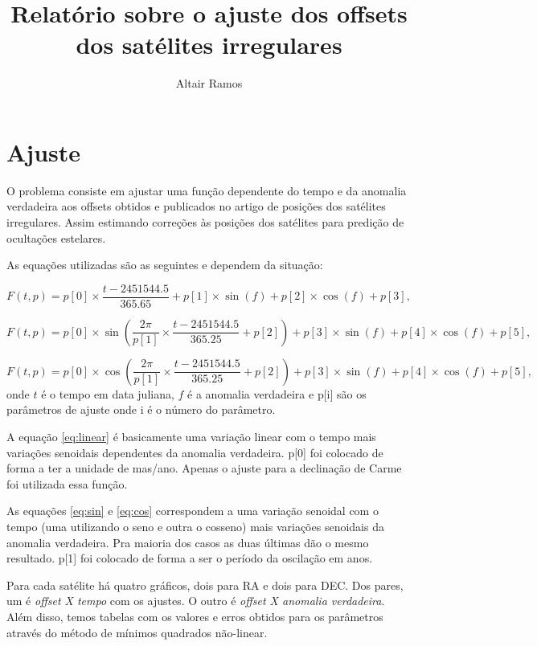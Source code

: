 \documentclass[11pt,a4paper]{report}
\title{Relatório sobre o ajuste dos offsets dos satélites irregulares}
\author{Altair Ramos}
\begin{document}
\maketitle

\chapter*{Ajuste}

\indent \indent O problema consiste em ajustar uma função dependente do tempo e da anomalia verdadeira aos offsets obtidos e publicados no artigo de posições dos satélites irregulares. Assim estimando correções às posições dos satélites para predição de ocultações estelares.

As equações utilizadas são as seguintes e dependem da situação:

\begin{equation}
F(t,p) = p[0]\times \frac{t - 2451544.5}{365.65} + p[1]\times \sin(f) + p[2]\times\cos(f) + p[3],
\label{eq:linear}
\end{equation}

\begin{equation}
F(t,p) = p[0]\times\sin\left(\frac{2\pi}{p[1]}\times \frac{t - 2451544.5}{365.25} + p[2]\right) + p[3]\times\sin(f) + p[4]\times\cos(f) + p[5],
\label{eq:sin}
\end{equation}

\begin{equation}
F(t,p) = p[0]\times\cos\left(\frac{2\pi}{p[1]}\times \frac{t - 2451544.5}{365.25} + p[2]\right) + p[3]\times\sin(f) + p[4]\times\cos(f) + p[5],
\label{eq:cos}
\end{equation}
onde $t$ é o tempo em data juliana, $f$ é a anomalia verdadeira e p[i] são os parâmetros de ajuste onde i é o número do parâmetro.

A equação \ref{eq:linear} é basicamente uma variação linear com o tempo mais variações senoidais dependentes da anomalia verdadeira. p[0] foi colocado de forma a ter a unidade de mas/ano. Apenas o ajuste para a declinação de Carme foi utilizada essa função.

As equaç\~oes \ref{eq:sin} e \ref{eq:cos} correspondem a uma variação senoidal com o tempo (uma utilizando o seno e outra o cosseno) mais variações senoidais da anomalia verdadeira. Pra maioria dos casos as duas últimas dão o mesmo resultado. p[1] foi colocado de forma a ser o período da oscilação em anos.

Para cada satélite há quatro gráficos, dois para RA e dois para DEC. Dos pares, um é \textit{offset X tempo} com os ajustes. O outro é \textit{offset X anomalia verdadeira}. Além disso, temos tabelas com os valores e erros obtidos para os parâmetros através do método de mínimos quadrados não-linear.
\end{document}
